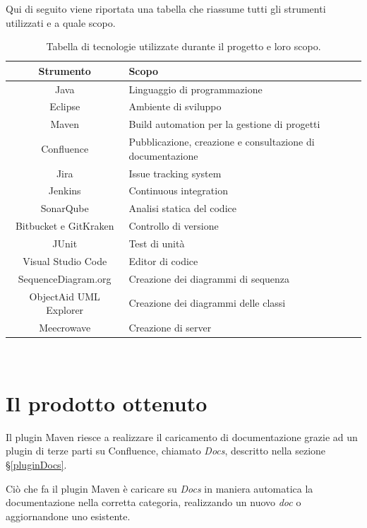     Qui di seguito viene riportata una tabella che riassume tutti gli strumenti utilizzati e a quale scopo.

        \begin{table}[H]
            {\def\arraystretch{1.5}
            \begin{tabularx}{\textwidth}{c | X}
                \rowcolor{beautyblue}
                \textbf{Strumento} &
                \textbf{Scopo} \\ \hline
                Java & Linguaggio di programmazione \\
                Eclipse & Ambiente di sviluppo \\
                Maven & Build automation per la gestione di progetti \\
                Confluence & Pubblicazione, creazione e consultazione di documentazione \\
                Jira & Issue tracking system \\
                Jenkins & Continuous integration \\
                SonarQube & Analisi statica del codice \\
                Bitbucket e GitKraken & Controllo di versione \\
                JUnit & Test di unità \\
                Visual Studio Code & Editor di codice \\
                SequenceDiagram.org & Creazione dei diagrammi di sequenza \\
                ObjectAid UML Explorer & Creazione dei diagrammi delle classi \\
                Meecrowave & Creazione di server \\
            \end{tabularx}} \\
        \caption{Tabella di tecnologie utilizzate durante il progetto e loro scopo.}
        \end{table}


\section{Il prodotto ottenuto}
Il plugin Maven riesce a realizzare il caricamento di documentazione grazie ad un plugin di terze parti su Confluence, chiamato \emph{Docs}, descritto nella sezione \S\ref{pluginDocs}.

Ciò che fa il plugin Maven è caricare su \emph{Docs} in maniera automatica la documentazione nella corretta categoria, realizzando un nuovo \emph{doc} o aggiornandone uno esistente.

